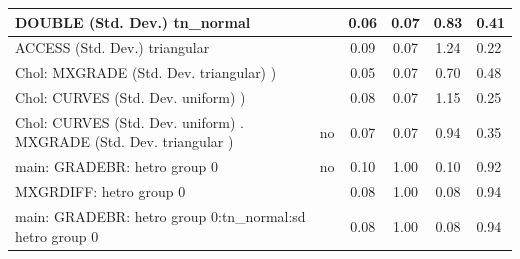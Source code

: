 \begin{table}
\begin{center}
\begin{tabular}{|l|l|c|c|c|l|}
			\hline
			DOUBLE (Std. Dev.) tn_normal &  & 0.06 & 0.07 & 0.83 & 0.41 \\
			\hline
			ACCESS (Std. Dev.) triangular &  & 0.09 & 0.07 & 1.24 & 0.22 \\
			\hline
			 Chol: MXGRADE (Std. Dev. triangular) ) &  & 0.05 & 0.07 & 0.70 & 0.48 \\
			\hline
			 Chol: CURVES (Std. Dev. uniform) ) &  & 0.08 & 0.07 & 1.15 & 0.25 \\
			\hline
			 Chol: CURVES (Std. Dev. uniform) . MXGRADE (Std. Dev.   triangular ) & no & 0.07 & 0.07 & 0.94 & 0.35 \\
			\hline
			main: GRADEBR: hetro group 0 & no & 0.10 & 1.00 & 0.10 & 0.92 \\
			\hline
			MXGRDIFF: hetro group 0 &  & 0.08 & 1.00 & 0.08 & 0.94 \\
			\hline
			main: GRADEBR: hetro group 0:tn_normal:sd  hetro group 0 &  & 0.08 & 1.00 & 0.08 & 0.94 \\
			\hline
		\end{tabular}
	\end{center}
\end{table}
